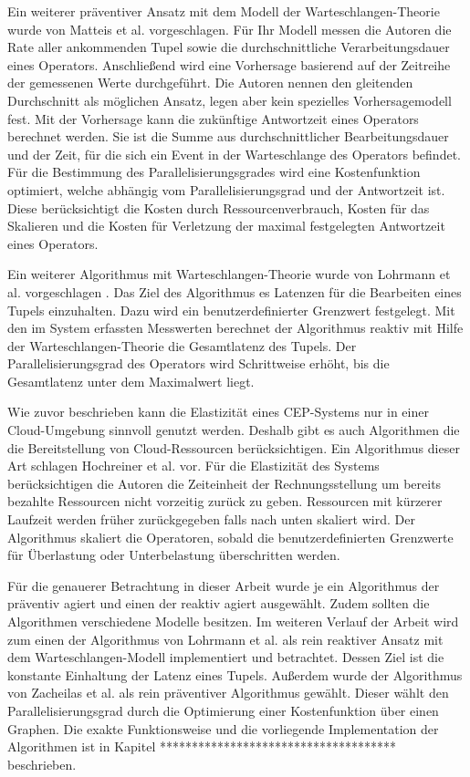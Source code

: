 Ein weiterer präventiver Ansatz mit dem Modell der Warteschlangen-Theorie wurde von Matteis et al. vorgeschlagen.
Für Ihr Modell messen die Autoren die Rate aller ankommenden Tupel sowie die durchschnittliche Verarbeitungsdauer eines Operators.
Anschließend wird eine Vorhersage basierend auf der Zeitreihe der gemessenen Werte durchgeführt. 
Die Autoren nennen den gleitenden Durchschnitt als möglichen Ansatz, legen aber kein spezielles Vorhersagemodell fest. 
Mit der Vorhersage kann die zukünftige Antwortzeit eines Operators berechnet werden.
Sie ist die Summe aus durchschnittlicher Bearbeitungsdauer und der Zeit, für die sich ein Event in der Warteschlange des Operators befindet.
Für die Bestimmung des Parallelisierungsgrades wird eine Kostenfunktion optimiert, welche abhängig vom Parallelisierungsgrad und der Antwortzeit ist.
Diese berücksichtigt die Kosten durch Ressourcenverbrauch, Kosten für das Skalieren und die Kosten für Verletzung der maximal festgelegten Antwortzeit eines Operators. 

Ein weiterer Algorithmus mit Warteschlangen-Theorie wurde von Lohrmann et al. vorgeschlagen \cite{lohrmann_elastic_2015}.
Das Ziel des Algorithmus es Latenzen für die Bearbeiten eines Tupels einzuhalten.
Dazu wird ein benutzerdefinierter Grenzwert festgelegt.
Mit den im System erfassten Messwerten berechnet der Algorithmus reaktiv mit Hilfe der Warteschlangen-Theorie die Gesamtlatenz des Tupels.
Der Parallelisierungsgrad des Operators wird Schrittweise erhöht, bis die Gesamtlatenz unter dem Maximalwert liegt.

Wie zuvor beschrieben kann die Elastizität eines CEP-Systems nur in einer Cloud-Umgebung sinnvoll genutzt werden.
Deshalb gibt es auch Algorithmen die die Bereitstellung von Cloud-Ressourcen berücksichtigen.
Ein Algorithmus dieser Art schlagen Hochreiner et al. vor.
Für die Elastizität des Systems berücksichtigen die Autoren die Zeiteinheit der Rechnungsstellung um bereits bezahlte Ressourcen nicht vorzeitig zurück zu geben.
Ressourcen mit kürzerer Laufzeit werden früher zurückgegeben falls nach unten skaliert wird.
Der Algorithmus skaliert die Operatoren, sobald die benutzerdefinierten Grenzwerte für Überlastung oder Unterbelastung überschritten werden.

Für die genauerer Betrachtung in dieser Arbeit wurde je ein Algorithmus der präventiv agiert und einen der reaktiv agiert ausgewählt.
Zudem sollten die Algorithmen verschiedene Modelle besitzen.
Im weiteren Verlauf der Arbeit wird zum einen der Algorithmus von Lohrmann et al. als rein reaktiver Ansatz mit dem Warteschlangen-Modell implementiert und betrachtet.
Dessen Ziel ist die konstante Einhaltung der Latenz eines Tupels.
Außerdem wurde der Algorithmus von Zacheilas et al. als rein präventiver Algorithmus gewählt.
Dieser wählt den Parallelisierungsgrad durch die Optimierung einer Kostenfunktion über einen Graphen.
Die exakte Funktionsweise und die vorliegende Implementation der Algorithmen ist in Kapitel ************************************* beschrieben.




